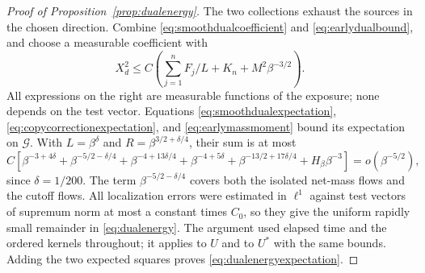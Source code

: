 \begin{proof}[Proof of Proposition~\ref{prop:dualenergy}]
The two collections exhaust the sources in the chosen direction.
Combine \eqref{eq:smoothdualcoefficient} and
\eqref{eq:earlydualbound}, and choose a measurable coefficient with
\[
 X_d^2\le C\left(\sum_{j=1}^nF_j/L+K_n+M^2\beta^{-3/2}\right).
\]
All expressions on the right are measurable functions of the
exposure; none depends on the test vector.  Equations
\eqref{eq:smoothdualexpectation},
\eqref{eq:copycorrectionexpectation}, and
\eqref{eq:earlymassmoment} bound its expectation on
\(\mathcal G\).  With \(L=\beta^\delta\) and
\(R=\beta^{3/2+\delta/4}\), their sum is at most
\begin{equation}\label{eq:energyfinalpowers}
 C\left[
 \beta^{-3+4\delta}
 +\beta^{-5/2-\delta/4}
 +\beta^{-4+13\delta/4}
 +\beta^{-4+5\delta}
 +\beta^{-13/2+17\delta/4}
 +H_\beta\beta^{-3}\right]
 =o(\beta^{-5/2}),
\end{equation}
since \(\delta=1/200\).
The term \(\beta^{-5/2-\delta/4}\) covers both the isolated
net-mass flows and the cutoff flows.  All localization errors were
estimated in \(\ell^1\) against test vectors of supremum norm
at most a constant times \(C_0\), so they give the uniform
rapidly small remainder in \eqref{eq:dualenergy}.
The argument used elapsed time and the ordered kernels throughout;
it applies to \(U\) and to \(U^*\) with the same bounds.
Adding the two expected squares proves
\eqref{eq:dualenergyexpectation}.
\end{proof}
